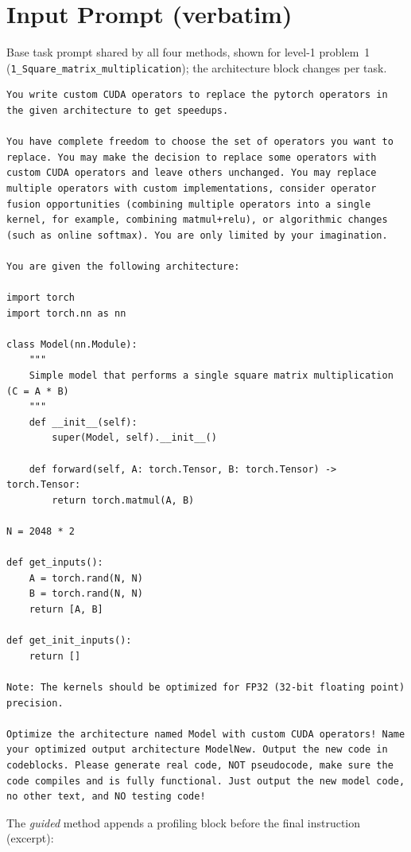 \documentclass[conference]{IEEEtran}
\begin{document}
\section{Input Prompt (verbatim)}

Base task prompt shared by all four methods, shown for level-1 problem~1
(\texttt{1\_Square\_matrix\_multiplication}); the architecture block changes per
task.

\begin{lstlisting}
You write custom CUDA operators to replace the pytorch operators in the given architecture to get speedups.

You have complete freedom to choose the set of operators you want to replace. You may make the decision to replace some operators with custom CUDA operators and leave others unchanged. You may replace multiple operators with custom implementations, consider operator fusion opportunities (combining multiple operators into a single kernel, for example, combining matmul+relu), or algorithmic changes (such as online softmax). You are only limited by your imagination.

You are given the following architecture:

import torch
import torch.nn as nn

class Model(nn.Module):
    """
    Simple model that performs a single square matrix multiplication (C = A * B)
    """
    def __init__(self):
        super(Model, self).__init__()

    def forward(self, A: torch.Tensor, B: torch.Tensor) -> torch.Tensor:
        return torch.matmul(A, B)

N = 2048 * 2

def get_inputs():
    A = torch.rand(N, N)
    B = torch.rand(N, N)
    return [A, B]

def get_init_inputs():
    return []

Note: The kernels should be optimized for FP32 (32-bit floating point) precision.

Optimize the architecture named Model with custom CUDA operators! Name your optimized output architecture ModelNew. Output the new code in codeblocks. Please generate real code, NOT pseudocode, make sure the code compiles and is fully functional. Just output the new model code, no other text, and NO testing code!
\end{lstlisting}

\noindent The \emph{guided} method appends a profiling block before the final
instruction (excerpt):
\end{document}
